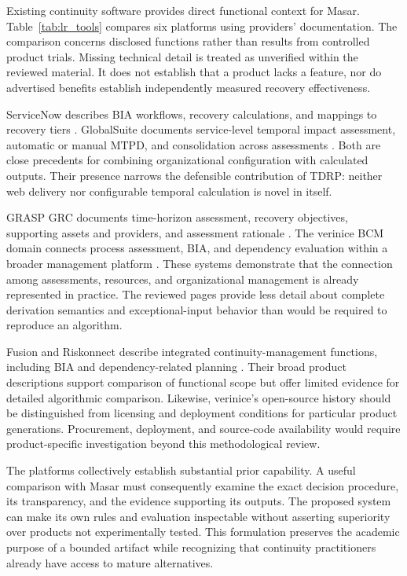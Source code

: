 Existing continuity software provides direct functional context for Masar. Table~\ref{tab:lr_tools} compares six platforms using providers' documentation. The comparison concerns disclosed functions rather than results from controlled product trials. Missing technical detail is treated as unverified within the reviewed material. It does not establish that a product lacks a feature, nor do advertised benefits establish independently measured recovery effectiveness.



ServiceNow describes BIA workflows, recovery calculations, and mappings to recovery tiers \cite{servicenow2025bia,servicenow2025rto,servicenow2025datasheet}. GlobalSuite documents service-level temporal impact assessment, automatic or manual MTPD, and consolidation across assessments \cite{globalsuite2025prebia}. Both are close precedents for combining organizational configuration with calculated outputs. Their presence narrows the defensible contribution of TDRP: neither web delivery nor configurable temporal calculation is novel in itself.

GRASP GRC documents time-horizon assessment, recovery objectives, supporting assets and providers, and assessment rationale \cite{grasp2025bia}. The verinice BCM domain connects process assessment, BIA, and dependency evaluation within a broader management platform \cite{verinice2025bcm}. These systems demonstrate that the connection among assessments, resources, and organizational management is already represented in practice. The reviewed pages provide less detail about complete derivation semantics and exceptional-input behavior than would be required to reproduce an algorithm.

Fusion and Riskonnect describe integrated continuity-management functions, including BIA and dependency-related planning \cite{fusion2026bcm,riskonnect2026bcm}. Their broad product descriptions support comparison of functional scope but offer limited evidence for detailed algorithmic comparison. Likewise, verinice's open-source history should be distinguished from licensing and deployment conditions for particular product generations. Procurement, deployment, and source-code availability would require product-specific investigation beyond this methodological review.

The platforms collectively establish substantial prior capability. A useful comparison with Masar must consequently examine the exact decision procedure, its transparency, and the evidence supporting its outputs. The proposed system can make its own rules and evaluation inspectable without asserting superiority over products not experimentally tested. This formulation preserves the academic purpose of a bounded artifact while recognizing that continuity practitioners already have access to mature alternatives.

